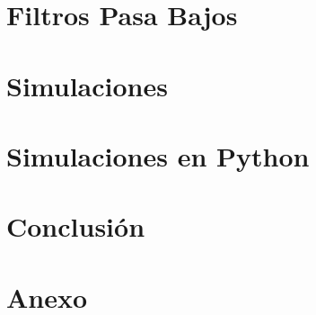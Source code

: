 \documentclass[11pt]{article}
\begin{document}
\section{Filtros Pasa Bajos}

\section{Simulaciones}


\section{Simulaciones en Python}


\section{Conclusión}


\section{Anexo}


\printbibliography

%
\end{document}
